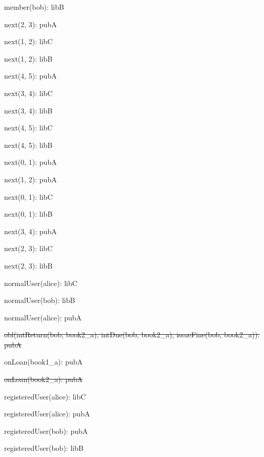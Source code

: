 \documentclass{article}
\newenvironment{states}
        {\begin{minipage}{\tableWidth}\raggedright\begin{description}[align=left,leftmargin=1em,noitemsep,labelsep=\parindent]}
        {\end{description}\end{minipage}}
\begin{document}
{\begin{states}
\item{{member(\allowbreak{}bob): libB}}
\item{{next(\allowbreak{}2, 3): pubA}}
\item{{next(\allowbreak{}1, 2): libC}}
\item{{next(\allowbreak{}1, 2): libB}}
\item{{next(\allowbreak{}4, 5): pubA}}
\item{{next(\allowbreak{}3, 4): libC}}
\item{{next(\allowbreak{}3, 4): libB}}
\item{{next(\allowbreak{}4, 5): libC}}
\item{{next(\allowbreak{}4, 5): libB}}
\item{{next(\allowbreak{}0, 1): pubA}}
\item{{next(\allowbreak{}1, 2): pubA}}
\item{{next(\allowbreak{}0, 1): libC}}
\item{{next(\allowbreak{}0, 1): libB}}
\item{{next(\allowbreak{}3, 4): pubA}}
\item{{next(\allowbreak{}2, 3): libC}}
\item{{next(\allowbreak{}2, 3): libB}}
\item{{normalUser(\allowbreak{}alice): libC}}
\item{{normalUser(\allowbreak{}bob): libB}}
\item{{normalUser(\allowbreak{}alice): pubA}}
\item{\sout{obl(\allowbreak{}intReturn(\allowbreak{}bob, book2\_a), intDue(\allowbreak{}bob, book2\_a), issueFine(\allowbreak{}bob, book2\_a)): pubA}}
\item{{onLoan(\allowbreak{}book1\_a): pubA}}
\item{\sout{onLoan(\allowbreak{}book2\_a): pubA}}
\item{{registeredUser(\allowbreak{}alice): libC}}
\item{{registeredUser(\allowbreak{}alice): pubA}}
\item{{registeredUser(\allowbreak{}bob): pubA}}
\item{{registeredUser(\allowbreak{}bob): libB}}
\end{states}}
\end{document}
